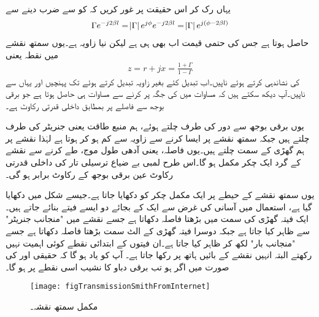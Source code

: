 یہاں رک کر اس حقیقت پر غور کریں کہ  کو  سے ضرب دینے سے
\begin{align*}
\Gamma e^{-j2 \beta l}= \abs{\Gamma} e^{j \phi} e^{-j 2 \beta l}= \abs{\Gamma} e^{j(\phi-2\beta l)}
\end{align*}
حاصل ہوتا ہے جس کی حتمی قیمت اب بھی  ہی ہے  لیکن نیا زاویہ  ہے۔یوں سمتھ نقشے میں نقطہ  یعنی 
\begin{align}\label{مساوات_ترسیلی_داخلی_رکاوٹ_سمتھ_پ}
z=r+j x=\frac{1+\Gamma}{1-\Gamma}
\end{align}
کی نشاندہی کرتے ہوئے   ناپیں۔اب  تبدیل کئے بغیر زاویہ تبدیل کرتے ہوئے  تک پہنچیں اور یہاں سے   ناپیں۔آپ دیکھ سکتے ہیں کہ مساوات  میں  کی جگہ  پر کرنے سے مساوات  ہی حاصل ہوتا ہے جو برقی بوجھ سے  فاصلے پر بمطابق  داخلی قدرتی رکاوٹ ہے۔

یوں برقی بوجھ  سے دور  کی طرف چلتے ہوئے، ہم منبع طاقت یعنی جنریٹر کی طرف چلتے ہیں جبکہ سمتھ نقشے پر ایسا کرنے سے زاویہ  سے کم ہو کر  ہوتا ہے لہٰذا نقشے پر ہم گھڑی کے سمت چلتے ہیں۔یوں  فاصلہ، یعنی آدھی طول موج، طے کرنے سے نقشے کے گرد ایک چکر مکمل ہو گا۔اس طرح  لمبی  بے ضیاع ترسیلی تار کی داخلی قدرتی رکاوٹ عین برقی بوجھ کے رکاوٹ برابر ہو گی۔

یوں سمتھ نقشے کے حیطے پر ایک مکمل چکر کو  دکھایا جاتا ہے۔جیسے شکل  میں دکھایا گیا ہے، استعمال میں آسانی کی غرض سے ایک کے بجائے دو ایسے  فیتے بنائے جاتے ہیں۔ایک فیتہ گھڑی کی سمت میں بڑھتا فاصلہ دکھاتا ہے جسے نقشے میں "منجانب جنریٹر" سے ظاہر کیا جاتا ہے جبکہ دوسرا فیتہ گھڑی کے الٹ سمت بڑھتا فاصلہ دکھاتا ہے جسے "منجانب بار" لکھ کر ظاہر کیا جاتا ہے۔ان فیتوں کے ابتدائی نقطے کوئی اہمیت نہیں رکھتے البتہ انہیں نقشے کے بائیں ہاتھ پر رکھا جاتا ہے۔ آپ کو یاد ہو گا کہ حقیقی  اور  کی صورت میں اگر  ہو تب برقی دباو کا نشیب اسی نقطے پر ہو گا۔
\begin{figure}
\centering
\texttt{[image: figTransmissionSmithFromInternet]}
\caption{مکمل سمتھ نقشہ۔}
\label{شکل_ترسیلی_مکمل_سمتھ_نقشہ}
\end{figure} 

